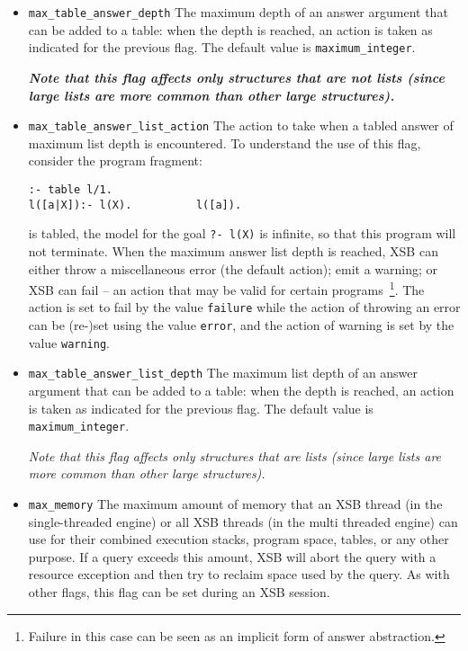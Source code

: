 \begin{description}
\begin{itemize}
\item {\tt max\_table\_answer\_depth} The maximum depth of an answer
  argument that can be added to a table: when the depth is reached, an
  action is taken as indicated for the previous flag.  The default
  value is {\tt maximum\_integer}.

{\bf  {\em Note that this flag affects only structures that are not lists
    (since large lists are more common than other large structures).
  }}

\item {\tt max\_table\_answer\_list\_action} The action to take when a
  tabled answer of maximum list depth is encountered.  To understand
  the use of this flag, consider the program fragment:
\begin{verbatim}
:- table l/1.
l([a|X]):- l(X).          l([a]).
\end{verbatim}
  is tabled, the model for the goal {\tt ?- l(X)} is infinite, so that
  this program will not terminate.  When the maximum answer list depth
  is reached, XSB can either throw a miscellaneous error (the default
  action); emit a warning; or XSB can fail -- an action that may be
  valid for certain programs~\footnote{Failure in this case can be
    seen as an implicit form of answer abstraction.}.  The action is
  set to fail by the value {\tt failure} while the action of throwing
  an error can be (re-)set using the value {\tt error}, and the action
  of warning is set by the value {\tt warning}.

\item {\tt max\_table\_answer\_list\_depth} The maximum list depth of
  an answer argument that can be added to a table: when the depth is
  reached, an action is taken as indicated for the previous flag.  The
  default value is {\tt maximum\_integer}.

  {\em Note that this flag affects only structures that are lists
    (since large lists are more common than other large structures).
  }

\item {\tt max\_memory} The maximum amount of memory that an XSB
  thread (in the single-threaded engine) or all XSB threads (in the
  multi threaded engine) can use for their combined execution stacks,
  program space, tables, or any other purpose.  If a query exceeds
  this amount, XSB will abort the query with a resource exception and
  then try to reclaim space used by the query.  As with other flags,
  this flag can be set during an XSB session.


\end{itemize}
\end{description}

